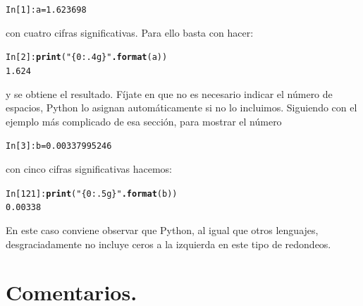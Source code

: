 \documentclass[10pt,a4paper]{article}\usepackage[]{graphicx}\usepackage[]{color}
\makeatletter
\newcommand{\hlnum}[1]{\textcolor[rgb]{0.686,0.059,0.569}{#1}}%
\newcommand{\hlstr}[1]{\textcolor[rgb]{0.192,0.494,0.8}{#1}}%
\newcommand{\hlopt}[1]{\textcolor[rgb]{0,0,0}{#1}}%
\newcommand{\hlstd}[1]{\textcolor[rgb]{0.345,0.345,0.345}{#1}}%
\newcommand{\hlkwb}[1]{\textcolor[rgb]{0.69,0.353,0.396}{#1}}%
\newcommand{\hlkwd}[1]{\textcolor[rgb]{0.737,0.353,0.396}{\textbf{#1}}}%
\newenvironment{kframe}{%
 \def\at@end@of@kframe{}%
 \ifinner\ifhmode%
  \def\at@end@of@kframe{\end{minipage}}%
  \begin{minipage}{\columnwidth}%
 \fi\fi%
 \def\FrameCommand##1{\hskip\@totalleftmargin \hskip-\fboxsep
 \colorbox{shadecolor}{##1}\hskip-\fboxsep
     \hskip-\linewidth \hskip-\@totalleftmargin \hskip\columnwidth}%
 \MakeFramed {\advance\hsize-\width
   \@totalleftmargin\z@ \linewidth\hsize
   \@setminipage}}%
 {\par\unskip\endMakeFramed%
 \at@end@of@kframe}
\newenvironment{knitrout}{}{} %
\makeatother
\begin{document}
\begin{knitrout}
\color{fgcolor}\begin{kframe}
\begin{alltt}
\hlstd{In [}\hlnum{1}\hlstd{]}\hlopt{:} \hlstd{a} \hlkwb{=} \hlnum{1.623698}
\end{alltt}
\end{kframe}
\end{knitrout}
con cuatro cifras significativas. Para ello basta con hacer:
\begin{knitrout}
\color{fgcolor}\begin{kframe}
\begin{alltt}
In [2]: \hlkwd{print}(\hlstr{"\{0:.4g\}"}\hlkwd{.format}(a))
1.624
\end{alltt}
\end{kframe}
\end{knitrout}
y se obtiene el resultado. Fíjate en que no es necesario indicar el número de espacios, Python lo asignan automáticamente si no lo incluimos. Siguiendo con el ejemplo más complicado de esa sección, para mostrar el número
\begin{knitrout}
\color{fgcolor}\begin{kframe}
\begin{alltt}
\hlstd{In [}\hlnum{3}\hlstd{]}\hlopt{:} \hlstd{b} \hlkwb{=} \hlnum{0.00337995246}
\end{alltt}
\end{kframe}
\end{knitrout}
con cinco cifras significativas hacemos:
\begin{knitrout}
\color{fgcolor}\begin{kframe}
\begin{alltt}
In [121]: \hlkwd{print}(\hlstr{"\{0:.5g\}"}\hlkwd{.format}(b))
0.00338
\end{alltt}
\end{kframe}
\end{knitrout}
En este caso conviene observar que Python, al igual que otros lenguajes, desgraciadamente no incluye ceros a la izquierda en este tipo de redondeos.


\section{Comentarios. }
\label{tut02:sec:comentarios}
\end{document}
